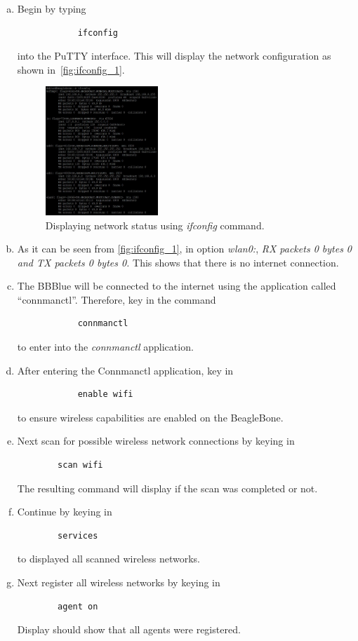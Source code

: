 \begin{enumerate}[a)]
    \item Begin by typing 
         \begin{verbatim}
            ifconfig
         \end{verbatim}
         into the PuTTY interface. This will display the network configuration as shown in~\autoref{fig:ifconfig_1}. 
         
\begin{figure}
    \centering
    \includegraphics[width= 0.4\textwidth]{figs/img/Lab0/ifconfig_1.JPG}
    \caption{Displaying network status using \emph{ifconfig} command.}
    \label{fig:ifconfig_1}
\end{figure} 

\item As it can be seen from \autoref{fig:ifconfig_1}, in option \emph{wlan0:},
  \emph{RX packets 0 bytes 0 and TX packets 0 bytes 0.} This shows that there is
  no internet connection.

  
\item The BBBlue will be connected to the internet using the application called
  ``connmanctl''. Therefore, key in the command
        \begin{verbatim}
            connmanctl
        \end{verbatim}
    to enter into the \emph{connmanctl} application.
    
    \item After entering the Connmanctl application, key in
        \begin{verbatim}
            enable wifi
        \end{verbatim}
    to ensure wireless capabilities are enabled on the BeagleBone.
    
    \item Next scan for possible wireless network connections by keying in
    \begin{verbatim}
        scan wifi
    \end{verbatim}
    The resulting command will display if the scan was completed or not.
    \item Continue by keying in
    \begin{verbatim}
        services
    \end{verbatim}
    to displayed all scanned wireless networks.
    \item Next register all wireless networks by keying in
    \begin{verbatim}
        agent on
    \end{verbatim}
    Display should show that all agents were registered.
    

\end{enumerate}
